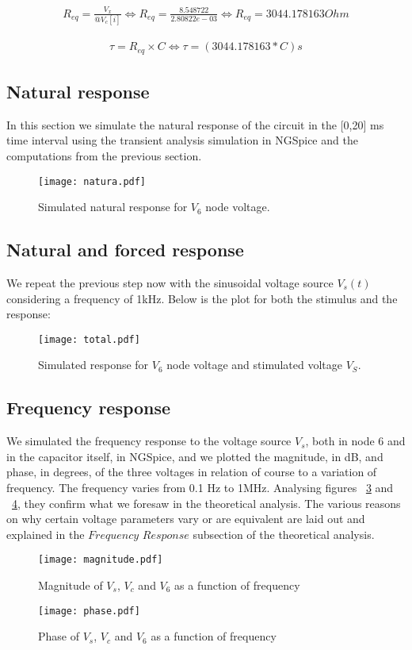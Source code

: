 \begin{gather*}
  R_{eq} = \frac{V_x}{@V_c[i]} \Leftrightarrow R_{eq} = \frac{8.548722}{2.80822e-03} \Leftrightarrow R_{eq} = 3044.178163 Ohm
\end{gather*}

\begin{gather*}
  \tau = R_{eq} \times C \Leftrightarrow \tau = (3044.178163*C)   s
\end{gather*}

\newpage
\subsection{Natural response}
In this section we simulate the natural response of the circuit in the [0,20] ms time interval using the transient analysis simulation in NGSpice and the computations from the previous section.
\begin{figure}[!h] \centering
\texttt{[image: natura.pdf]}
\caption{Simulated natural response for $V_{6}$ node voltage.}
\label{fig:natura}
\end{figure}
\newpage
\subsection{Natural and forced response}
We repeat the previous step now with the sinusoidal voltage source $V_{s}(t)$ considering a frequency of 1kHz. Below is the plot for both the stimulus and the response:
\begin{figure}[!h] \centering
\texttt{[image: total.pdf]}
\caption{Simulated response for $V_{6}$ node voltage and stimulated voltage $V_{S}$.}
\label{fig:total}
\end{figure}
\newpage
\subsection{Frequency response}
We simulated the frequency response to the voltage source $V_{s}$, both in node 6 and in the capacitor itself, in NGSpice, and we plotted the magnitude, in dB, and phase, in degrees, of the three voltages in relation of course to a variation of frequency. The frequency varies from 0.1 Hz to 1MHz. Analysing figures ~\ref{fig:magnitude} and ~\ref{fig:phase}, they confirm what we foresaw in the theoretical analysis. The various reasons on why certain voltage parameters vary or are equivalent are laid out and explained in the $Frequency$ $Response$ subsection of the theoretical analysis.
\begin{figure}[!h] \centering
\texttt{[image: magnitude.pdf]}
\caption{Magnitude of $V_{s}$, $V_{c}$ and $V_{6}$ as a function of frequency}
\label{fig:magnitude}
\end{figure}
\begin{figure}[h] \centering
\texttt{[image: phase.pdf]}
\caption{Phase of $V_{s}$, $V_{c}$ and $V_{6}$ as a function of frequency}
\label{fig:phase}
\end{figure}
\par
